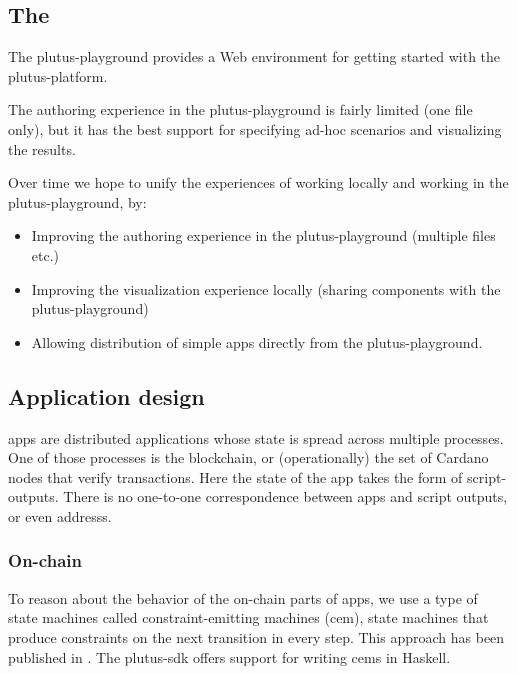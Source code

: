 \subsection{The }
\label{sec:plutus-playground}

The \gls{plutus-playground} provides a Web environment for getting started with the \gls{plutus-platform}.

The authoring experience in the \gls{plutus-playground} is fairly limited (one file only), but it has the best support for specifying ad-hoc scenarios and visualizing the results.

Over time we hope to unify the experiences of working locally and working in the \gls{plutus-playground}, by:
\begin{itemize}
\item Improving the authoring experience in the \gls{plutus-playground} (multiple files etc.)
\item Improving the visualization experience locally (sharing components with the \gls{plutus-playground})
\item Allowing distribution of simple \glspl{app} directly from the \gls{plutus-playground}.
\end{itemize}

\subsection{Application design}
\label{sec:application-design}


\glspl{app} are distributed applications whose state is spread across multiple processes.
One of those processes is the blockchain, or (operationally) the set of Cardano \glspl{node} that verify transactions.
Here the state of the \gls{app} takes the form of \glspl{script-output}.
There is no one-to-one correspondence between \glspl{app} and script outputs, or even \glspl{address}.

\subsubsection{On-chain}

To reason about the behavior of the on-chain parts of \glspl{app}, we use a type of state machines called constraint-emitting machines (\gls{cem}), state machines that produce constraints on the next transition in every step.
This approach has been published in \cite{DBLP:conf/isola/Chakravarty0MMM20a}.
The \gls{plutus-sdk} offers support for writing \glspl{cem} in Haskell.

